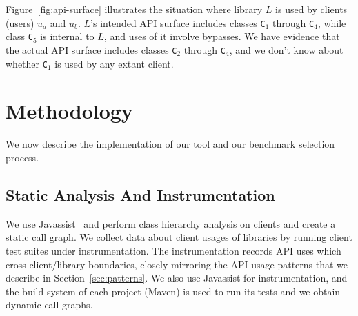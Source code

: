 Figure~\ref{fig:api-surface} illustrates the situation where library
$L$ is used by clients (users) $u_a$ and $u_b$. $L$'s intended API surface
includes classes \texttt{C}$_1$ through \texttt{C}$_4$, while class
\texttt{C}$_5$ is internal to $L$, and uses of it involve bypasses. We
have evidence that the actual API surface includes classes
\texttt{C}$_2$ through \texttt{C}$_4$, and we don't know about whether
\texttt{C}$_1$ is used by any extant client.


\section{Methodology}
\label{sec:methodology}

We now describe the implementation of our tool and our benchmark selection process.

\subsection{Static Analysis And Instrumentation}
\label{sec:methodology}

We use Javassist~\cite{chiba00:_load_struc_reflec_java} and perform class hierarchy analysis on clients
and create a static call graph. We collect data about client usages of libraries by running client
test suites under instrumentation. The instrumentation records API
uses which cross client/library boundaries, closely mirroring the API
usage patterns that we describe in
Section~\ref{sec:patterns}. We also use Javassist for instrumentation,
and the build system of each project (Maven) is used to run its
tests and we obtain dynamic call graphs. 
\\

